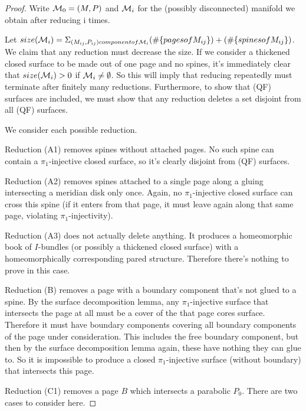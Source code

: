 \begin{proof}

Write $\mathcal{M}_0 = (M,P)$ and $\mathcal{M}_i$ for the (possibly disconnected) manifold we
obtain after reducing i times.

Let $size(\mathcal{M}_i) = \Sigma_{(M_{ij},P_{ij}) component of \mathcal{M}_i} (\#\{pages of
M_{ij}\}) + (\#\{spines of M_{ij}\})$. We claim that any reduction must
decrease the size. If we consider a thickened closed surface to be made out of
one page and no spines, it's immediately clear that $size(\mathcal{M}_i)>0$ if $\mathcal{M}_i
\neq \emptyset$.  So this will imply that reducing repeatedly must terminate
after finitely many reductions. Furthermore, to show that (QF) surfaces are
included, we must show that any reduction deletes a set disjoint from all (QF)
surfaces.

We consider each possible reduction.

Reduction (A1) removes spines without attached pages. No such spine can contain
a $\pi_1$-injective closed surface, so it's clearly disjoint from (QF) surfaces.

Reduction (A2) removes spines attached to a single page along a gluing
intersecting a meridian disk only once. Again, no $\pi_1$-injective closed surface
can cross this spine (if it enters from that page, it must leave again along
that same page, violating $\pi_1$-injectivity).


Reduction (A3) does not actually delete anything. It produces a homeomorphic
book of $I$-bundles (or possibly a thickened closed surface) with
a homeomorphically corresponding pared structure. Therefore there's nothing to
prove in this case.

Reduction (B) removes a page with a boundary component that's not glued to
a spine. By the surface decomposition lemma, any $\pi_1$-injective surface that
intersects the page at all must be a cover of the that page cores surface.
Therefore it must have boundary components covering all boundary components of
the page under consideration. This includes the free boundary component, but
then by the surface decomposition lemma again, these have nothing they can glue
to. So it is impossible to produce a closed $\pi_1$-injective surface (without
boundary) that intersects this page.

Reduction (C1) removes a page $B$ which intersects a parabolic $P_0$. There are
two cases to consider here.


\end{proof}
